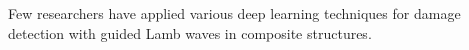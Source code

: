 Few researchers have applied various deep learning techniques for damage detection with guided Lamb waves in composite structures. 
%	
